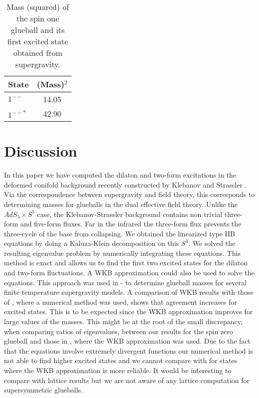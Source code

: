 \documentclass[12pt,epsf,a4paper]{article}
\begin{document}
\begin{table}[hbt]
\centering

\begin{tabular}{|l|c|}     \hline\hline
   {\bf State} &  {\bf (Mass)$^2$} \\ \hline
   $1^{--}$    &  14.05 \\
   $1^{--*}$     &  42.90 \\
    \hline\hline
\end{tabular}

\caption{Mass (squared) of the spin one glueball and its first 
excited state obtained from supergravity.}

\label{tab2}
\end{table}




\section{Discussion}


In this paper we have computed the dilaton and two-form excitations 
in the deformed conifold background recently constructed by Klebanov and 
Strassler \cite{KS}. Via the correspondence between supergravity and field theory, this 
corresponds to determining masses for glueballs in the dual effective field theory.
Unlike the $AdS_5 \times S^5$ case, the Klebanov-Strassler background
contains non trivial three-form and five-form fluxes. 
Far in the infrared the three-form flux prevents the three-cycle of the base 
from collapsing. We obtained the linearized type IIB equations by doing 
a Kaluza-Klein decomposition on this $S^3$. We 
solved the resulting eigenvalue problem by numerically integrating these 
equations. This method is exact and allows us to find the first two excited 
states for the dilaton and two-form fluctuations. A WKB approximation could also be 
used to solve the equations. This  approach was used in \cite{1}-\cite{3} to 
determine glueball masses for several finite temperature supergravity models. A comparison of WKB
results with those of \cite{gb1}, where a numerical method was used, shows that agreement increases 
for excited states. This is to be expected since the WKB 
approximation improves for large values of the masses.
This might be at the root of the small discrepancy, when comparing ratios of eigenvalues, between 
our results for the spin zero glueball and those in \cite{krasnitz}, 
where the WKB approximation was used. Due to the fact that the equations 
involve extremely divergent functions our numerical method is 
not able to find higher excited states and we cannot compare with 
\cite{krasnitz} for states where the WKB approximation is more reliable.
It would be interesting to compare with lattice results 
but we are not aware of any lattice computation for supersymmetric glueballs.
  
\end{document}
